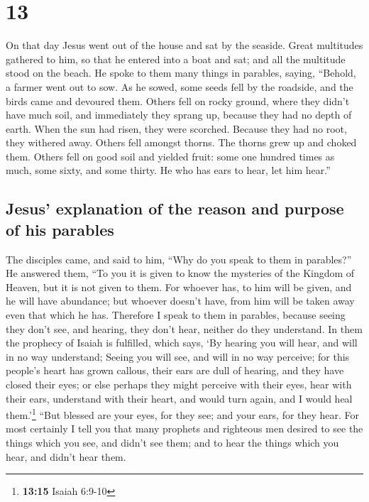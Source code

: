 \hypertarget{section-12}{%
\section{13}\label{section-12}}

 On that day Jesus went out of the house and sat by the
seaside.  Great multitudes gathered to him, so that he
entered into a boat and sat; and all the multitude stood on the beach.
 He spoke to them many things in parables, saying,
``Behold, a farmer went out to sow.  As he sowed, some
seeds fell by the roadside, and the birds came and devoured them.
 Others fell on rocky ground, where they didn't have much
soil, and immediately they sprang up, because they had no depth of
earth.  When the sun had risen, they were scorched.
Because they had no root, they withered away.  Others fell
amongst thorns. The thorns grew up and choked them. 
Others fell on good soil and yielded fruit: some one hundred times as
much, some sixty, and some thirty.  He who has ears to
hear, let him hear.''

\hypertarget{jesus-explanation-of-the-reason-and-purpose-of-his-parables}{%
\subsection{Jesus' explanation of the reason and purpose of his
parables}\label{jesus-explanation-of-the-reason-and-purpose-of-his-parables}}

 The disciples came, and said to him, ``Why do you speak
to them in parables?''  He answered them, ``To you it is
given to know the mysteries of the Kingdom of Heaven, but it is not
given to them.  For whoever has, to him will be given,
and he will have abundance; but whoever doesn't have, from him will be
taken away even that which he has.  Therefore I speak to
them in parables, because seeing they don't see, and hearing, they don't
hear, neither do they understand.  In them the prophecy
of Isaiah is fulfilled, which says, `By hearing you will hear, and will
in no way understand; Seeing you will see, and will in no way perceive;
 for this people's heart has grown callous, their ears
are dull of hearing, and they have closed their eyes; or else perhaps
they might perceive with their eyes, hear with their ears, understand
with their heart, and would turn again, and I would heal
them.'\footnote{\textbf{13:15} Isaiah 6:9-10}  ``But
blessed are your eyes, for they see; and your ears, for they hear.
 For most certainly I tell you that many prophets and
righteous men desired to see the things which you see, and didn't see
them; and to hear the things which you hear, and didn't hear them.

